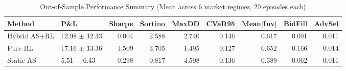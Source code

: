 \begin{table}[htbp]
\centering
\caption{Out-of-Sample Performance Summary (Mean across 6 market regimes, 20 episodes each)}
\label{tab:overall}
\small
\begin{tabular}{llrrrrrrr}
\toprule
Method & P\&L & Sharpe & Sortino & MaxDD & CVaR95 & Mean|Inv| & BidFill & AdvSel \\
\midrule
Hybrid AS+RL & 12.98 $\pm$ 12.33 & 0.004 & 2.588 & 2.740 & 0.146 & 0.617 & 0.091 & 0.011 \\
Pure RL & 17.16 $\pm$ 13.36 & 1.509 & 3.705 & 1.495 & 0.127 & 0.652 & 0.166 & 0.014 \\
Static AS & 5.51 $\pm$ 6.43 & -0.298 & -0.817 & 4.598 & 0.136 & 0.389 & 0.062 & 0.011 \\
\bottomrule
\end{tabular}
\end{table}

